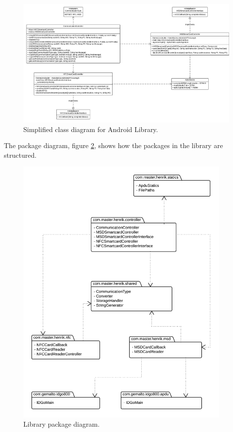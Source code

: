 \begin{figure}[h!]
  \caption{Simplified class diagram for Android Library.}
  \label{fig:classdiagram_simple}
  \centering
    \includegraphics[width=1.25\textwidth, angle =90]{images/Class_Diagram.png}
\end{figure}
The package diagram, figure \ref{fig:package}, shows how  the packages in the library are structured.

\begin{figure}[h!]
  \caption{Library package diagram.}
  \label{fig:package}
  \centering
    \includegraphics[width=0.95\textwidth]{images/package2.png}
\end{figure}
